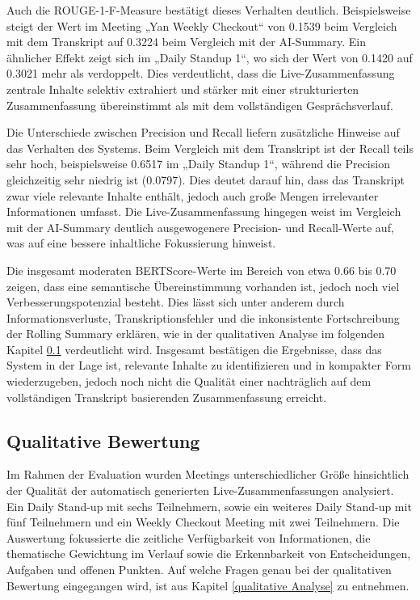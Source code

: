 Auch die ROUGE-1-F-Measure bestätigt dieses Verhalten deutlich. Beispielsweise steigt der Wert im Meeting „Yan Weekly Checkout“ von 0.1539 beim Vergleich mit dem Transkript auf 0.3224 beim Vergleich mit der AI-Summary. Ein ähnlicher Effekt zeigt sich im „Daily Standup 1“, wo sich der Wert von 0.1420 auf 0.3021 mehr als verdoppelt. Dies verdeutlicht, dass die Live-Zusammenfassung zentrale Inhalte selektiv extrahiert und stärker mit einer strukturierten Zusammenfassung übereinstimmt als mit dem vollständigen Gesprächsverlauf.

Die Unterschiede zwischen Precision und Recall liefern zusätzliche Hinweise auf das Verhalten des Systems. Beim Vergleich mit dem Transkript ist der Recall teils sehr hoch, beispielsweise 0.6517 im „Daily Standup 1“, während die Precision gleichzeitig sehr niedrig ist (0.0797). Dies deutet darauf hin, dass das Transkript zwar viele relevante Inhalte enthält, jedoch auch große Mengen irrelevanter Informationen umfasst. Die Live-Zusammenfassung hingegen weist im Vergleich mit der AI-Summary deutlich ausgewogenere Precision- und Recall-Werte auf, was auf eine bessere inhaltliche Fokussierung hinweist.

Die insgesamt moderaten BERTScore-Werte im Bereich von etwa 0.66 bis 0.70 zeigen, dass eine semantische Übereinstimmung vorhanden ist, jedoch noch viel Verbesserungspotenzial besteht. Dies lässt sich unter anderem durch Informationsverluste, Transkriptionsfehler und die inkonsistente Fortschreibung der Rolling Summary erklären, wie in der qualitativen Analyse im folgenden Kapitel \ref{subjektiv_Bewertung} verdeutlicht wird. Insgesamt bestätigen die Ergebnisse, dass das System in der Lage ist, relevante Inhalte zu identifizieren und in kompakter Form wiederzugeben, jedoch noch nicht die Qualität einer nachträglich auf dem vollständigen Transkript basierenden Zusammenfassung erreicht.

\subsection{Qualitative Bewertung}
\label{subjektiv_Bewertung}
Im Rahmen der Evaluation wurden Meetings unterschiedlicher Größe hinsichtlich der Qualität der automatisch generierten Live-Zusammenfassungen analysiert. Ein Daily Stand-up mit sechs Teilnehmern, sowie ein weiteres Daily Stand-up mit fünf Teilnehmern und ein Weekly Checkout Meeting mit zwei Teilnehmern. Die Auswertung fokussierte die zeitliche Verfügbarkeit von Informationen, die thematische Gewichtung im Verlauf sowie die Erkennbarkeit von Entscheidungen, Aufgaben und offenen Punkten. Auf welche Fragen genau bei der qualitativen Bewertung eingegangen wird, ist aus Kapitel \ref{qualitative Analyse} zu entnehmen.

